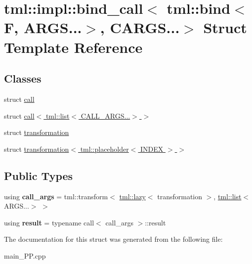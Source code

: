 \hypertarget{structtml_1_1impl_1_1bind__call_3_01tml_1_1bind_3_01F_00_01ARGS_8_8_8_4_00_01CARGS_8_8_8_4}{\section{tml\+:\+:impl\+:\+:bind\+\_\+call$<$ tml\+:\+:bind$<$ F, A\+R\+G\+S...$>$, C\+A\+R\+G\+S...$>$ Struct Template Reference}
\label{structtml_1_1impl_1_1bind__call_3_01tml_1_1bind_3_01F_00_01ARGS_8_8_8_4_00_01CARGS_8_8_8_4}
}
\subsection*{Classes}
\begin{DoxyCompactItemize}
\item 
struct \hyperlink{structtml_1_1impl_1_1bind__call_3_01tml_1_1bind_3_01F_00_01ARGS_8_8_8_4_00_01CARGS_8_8_8_4_1_1call}{call}
\item 
struct \hyperlink{structtml_1_1impl_1_1bind__call_3_01tml_1_1bind_3_01F_00_01ARGS_8_8_8_4_00_01CARGS_8_8_8_4_1_1cabeeb463ce0b78f48e1c992fa9dca66e1}{call$<$ tml\+::list$<$ C\+A\+L\+L\+\_\+\+A\+R\+G\+S...$>$ $>$}
\item 
struct \hyperlink{structtml_1_1impl_1_1bind__call_3_01tml_1_1bind_3_01F_00_01ARGS_8_8_8_4_00_01CARGS_8_8_8_4_1_1transformation}{transformation}
\item 
struct \hyperlink{structtml_1_1impl_1_1bind__call_3_01tml_1_1bind_3_01F_00_01ARGS_8_8_8_4_00_01CARGS_8_8_8_4_1_1trfdcad4869966fa995f189aee681c9846}{transformation$<$ tml\+::placeholder$<$ I\+N\+D\+E\+X $>$ $>$}
\end{DoxyCompactItemize}
\subsection*{Public Types}
\begin{DoxyCompactItemize}
\item 
\hypertarget{structtml_1_1impl_1_1bind__call_3_01tml_1_1bind_3_01F_00_01ARGS_8_8_8_4_00_01CARGS_8_8_8_4_a16d4afd17f040a4eb321375a8817b911}{using {\bfseries call\+\_\+args} = tml\+::transform$<$ \hyperlink{structtml_1_1lazy}{tml\+::lazy}$<$ transformation $>$, \hyperlink{structtml_1_1list}{tml\+::list}$<$ A\+R\+G\+S...$>$ $>$}\label{structtml_1_1impl_1_1bind__call_3_01tml_1_1bind_3_01F_00_01ARGS_8_8_8_4_00_01CARGS_8_8_8_4_a16d4afd17f040a4eb321375a8817b911}

\item 
\hypertarget{structtml_1_1impl_1_1bind__call_3_01tml_1_1bind_3_01F_00_01ARGS_8_8_8_4_00_01CARGS_8_8_8_4_a8fb74177d62971400d5edbd148269dd8}{using {\bfseries result} = typename call$<$ call\+\_\+args $>$\+::result}\label{structtml_1_1impl_1_1bind__call_3_01tml_1_1bind_3_01F_00_01ARGS_8_8_8_4_00_01CARGS_8_8_8_4_a8fb74177d62971400d5edbd148269dd8}

\end{DoxyCompactItemize}


The documentation for this struct was generated from the following file\+:\begin{DoxyCompactItemize}
\item 
main\+\_\+\+P\+P.\+cpp\end{DoxyCompactItemize}
